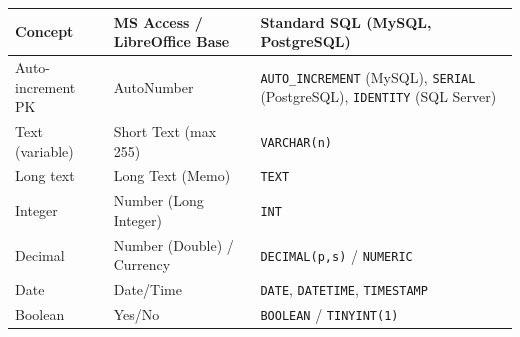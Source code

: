 \documentclass[11pt]{article}
\begin{document}
\begin{exemplebox}
\begin{center}
\begin{tabularx}{\linewidth}{|l|X|X|}
\hline
\rowcolor{popblueL} \textbf{Concept} & \textbf{MS Access / LibreOffice Base} & \textbf{Standard SQL (MySQL, PostgreSQL)} \\
\hline
Auto-increment PK & AutoNumber & \texttt{AUTO\_INCREMENT} (MySQL), \texttt{SERIAL} (PostgreSQL), \texttt{IDENTITY} (SQL Server) \\
Text (variable) & Short Text (max 255) & \texttt{VARCHAR(n)} \\
Long text & Long Text (Memo) & \texttt{TEXT} \\
Integer & Number (Long Integer) & \texttt{INT} \\
Decimal & Number (Double) / Currency & \texttt{DECIMAL(p,s)} / \texttt{NUMERIC} \\
Date & Date/Time & \texttt{DATE}, \texttt{DATETIME}, \texttt{TIMESTAMP} \\
Boolean & Yes/No & \texttt{BOOLEAN} / \texttt{TINYINT(1)} \\
\hline
\end{tabularx}
\end{center}
\end{exemplebox}
\end{document}
